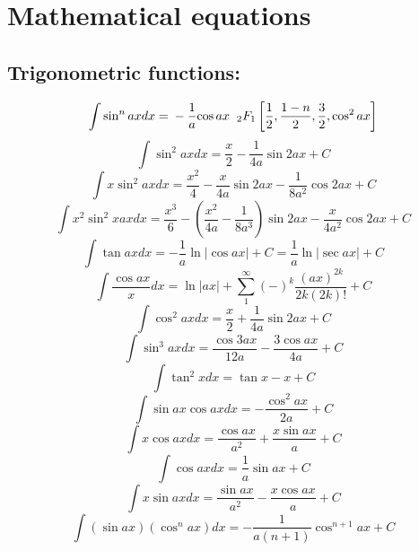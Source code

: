 \documentclass[12pt,a4paper]{article}
\begin{document}
	
	\section*{Mathematical equations}
	\subsection*{Trigonometric functions:}
	\begin{equation}
		\int \sin^n ax dx =
		\nonumber \\ 
		-\frac{1}{a}{\cos ax} \hspace{2mm}{_2F_1}\left[
		\frac{1}{2}, \frac{1-n}{2}, \frac{3}{2}, \cos^2 ax
		\right]
	\end{equation}
	\begin{equation}
		\int \sin ^2 ax dx = \frac{x}{2} - \frac{1}{4a} \sin 2ax + C
	\end{equation}
	\begin{equation}
		\int x \sin ^2 ax dx = \frac{x^2}{4} - \frac{x}{4a} \sin 2ax - \frac{1}{8a^2} \cos 2ax + C
	\end{equation}
	\begin{equation}
		\int x^2 \sin^2 x ax dx = \frac{x^3}{6} - (\frac{x^2}{4a} - \frac{1}{8a^3})\sin 2ax - \frac{x}{4a^2} \cos 2ax +C
	\end{equation}
	\begin{equation}
		\int \tan ax dx = - \frac{1}{a} \ln |\cos ax| + C = \frac{1}{a} \ln |\sec ax | +C
	\end{equation}
	\begin{equation}
		\int \frac{\cos ax}{x} dx = \ln |ax| + \sum_{1}^{\infty} (-)^k \frac{(ax)^{2k}}{2k (2k)!} +C
	\end{equation}
	\begin{equation}
		\int \cos ^2 ax dx = \frac{x}{2} + \frac{1}{4a} \sin 2ax + C
	\end{equation}
	\begin{equation}
		\int \sin^3 ax dx = \frac{\cos 3ax}{12a} - \frac{3 \cos ax}{4a} + C
	\end{equation}
	\begin{equation}
		\int \tan^2 x dx = \tan x -x +C
	\end{equation}
	\begin{equation}
		\int \sin ax \cos ax dx = - \frac{\cos^2 ax}{2a} + C
	\end{equation}
	\begin{equation}
		\int x \cos ax dx = \frac{\cos ax}{a^2} + \frac{x \sin ax}{a} + C
	\end{equation}
	\begin{equation}
		\int \cos ax dx = \frac{1}{a} \sin ax + C
	\end{equation}
	\begin{equation}
		\int x \sin ax dx = \frac{\sin ax }{a^2} -\frac{x \cos ax }{a} + C
	\end{equation}
	\begin{equation}
		\int (\sin ax) (\cos^n ax) dx = - \frac{1}{a ( n + 1)} \cos ^{n+1} ax + C
	\end{equation}
	
\end{document}
